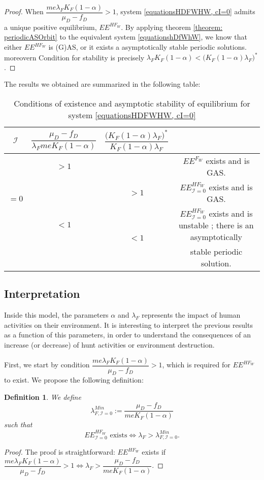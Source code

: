 \documentclass{article}
\newcommand{\lfw}{\lambda_{F}}
\newcommand{\lfw}{\lambda_{F}}
\newcommand{\cI}{\mathcal{I}}
\newtheorem{definition}{Definition}
\begin{document}
\begin{proof}
When $\dfrac{m e \lfw K_F(1-\alpha)}{\mu_D - f_D} > 1$, system \eqref{equationsHDFWHW, cI=0} admits a unique positive equilibrium, $EE^{HF_W}$.  
By applying theorem \ref{theorem: periodicASOrbit} to the equivalent system \eqref{equationshDfWhW}, we know that either $EE^{HF_W}$ is (G)AS, or it exists a asymptotically stable periodic solutions. moreovern Condition for stability is precisely $\lfw K_F(1-\alpha) < \Big(K_F(1-\alpha) \lfw \Big)^*$.
\end{proof} 

The results we obtained are summarized in the following table:
\begin{table}[!ht]
\centering
\def\arraystretch{2}
\begin{tabular}{c|c|c|c}
$\cI$ & $\dfrac{\mu_D - f_D}{\lfw m e K_F(1-\alpha)}$ &  $\dfrac{\Big(K_F(1-\alpha) \lfw \Big)^*}{K_F(1-\alpha) \lfw}$ & \\
\hline
\multirow{3}{*}{$=0$} & $ > 1$ & &$EE^{F_W}$ exists and is GAS.  \\
\cline{2-4}
 & \multirow{3}{*}{$< 1$} & $>1$ &$EE^{HF_W}_{\cI=0}$ exists and is GAS.\\
 \cline{3-4}
 & & \multirow{2}{*}{$ < 1$} & $EE^{HF_W}_{\cI=0}$ exists and is unstable ; there is an asymptotically \\
 & & &  stable periodic solution.
\end{tabular}
\caption{\centering Conditions of existence and asymptotic stability of equilibrium for system \eqref{equationsHDFWHW, cI=0}}
\end{table}


\subsection{Interpretation}
Inside this model, the parameters $\alpha$ and $\lfw$ represents the impact of human activities on their environment. It is interesting to interpret the previous results as a function of this parameters, in order to understand the consequences of an increase (or decrease) of hunt activities or environment destruction.

First, we start by condition $\dfrac{m e \lfw  K_F(1-\alpha)}{\mu_D - f_D} > 1$, which is required for $EE^{HF_W}$ to exist. We propose the following definition:

\begin{definition}\label{defLambdaMin, cI=0} We define 
$$\lambda_{F, \cI=0}^{Min} := \dfrac{\mu_D - f_D}{m e K_F(1-\alpha)}$$
such that 
$$
\text{$EE^{HF_W}_{\cI = 0}$ exists} \Leftrightarrow  \lfw > \lambda_{F, \cI=0}^{Min}.
$$
\end{definition}
\begin{proof}
The proof is straightforward: $EE^{HF_W}$ exists if $\dfrac{m e \lfw K_F(1-\alpha)}{\mu_D - f_D} > 1 \Leftrightarrow  \lfw> \dfrac{\mu_D - f_D}{ m e K_F(1-\alpha)} $.
\end{proof}
\end{document}
